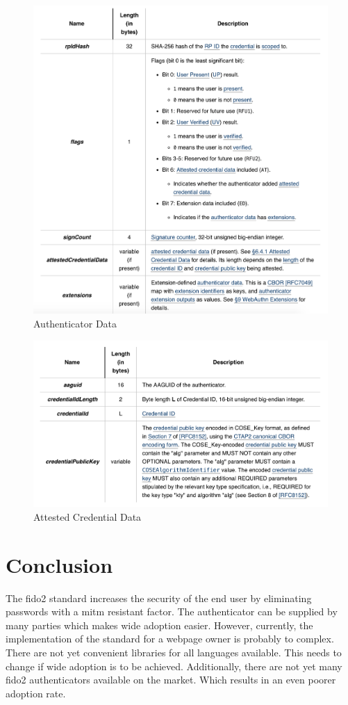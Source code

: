 \documentclass[a4paper, 11pt]{scrartcl}
\begin{document}
\begin{figure}[ht]
  \includegraphics[width=12cm]{img/authenticatorResponseData.png}
  \centering
  \caption{Authenticator Data}
  \label{fig:authenticatorData}
\end{figure}

\begin{figure}[ht]
  \includegraphics[width=12cm]{img/authenticatorData.png}
  \centering
  \caption{Attested Credential Data}
  \label{fig:credentialData}
\end{figure}



\section{Conclusion}
The \gls{fido2} standard increases the security of the end user by eliminating passwords with a \gls{mitm} resistant factor. The authenticator can be supplied by many parties which makes wide adoption easier. However, currently, the implementation of the standard for a webpage owner is probably to complex. There are not yet convenient libraries for all languages available. This needs to change if wide adoption is to be achieved. Additionally, there are not yet many \gls{fido2} authenticators available on the market. Which results in an even poorer adoption rate. 
\end{document}
